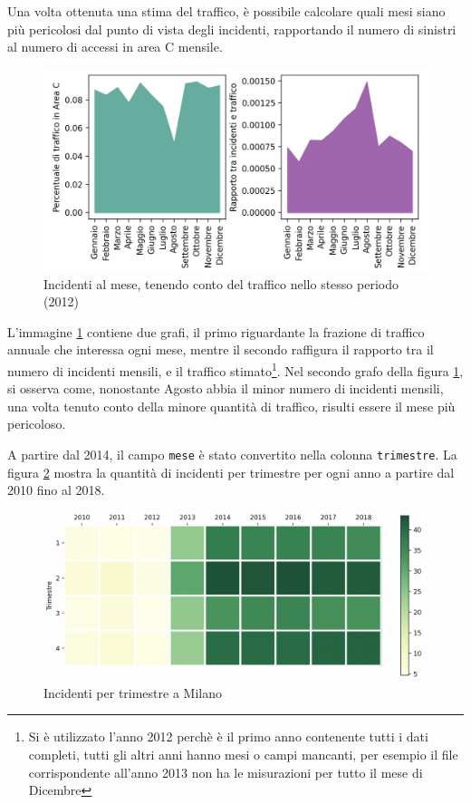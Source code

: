 \documentclass[a4paper,12pt]{report}
\newcommand{\columnstyle}[1]{\texttt{#1}}
\begin{document}
Una volta ottenuta una stima del traffico, è possibile calcolare quali mesi 
siano più pericolosi dal punto di vista degli incidenti, rapportando il numero di 
sinistri al numero di accessi in area C mensile.

\begin{figure}
    \includegraphics[width=\linewidth]{../src/area_c/rapporto_mese.png}
    \caption{Incidenti al mese, tenendo conto del traffico nello stesso periodo (2012)}
    \label{fig:incidenti-traffico-mese}
\end{figure}

L'immagine \ref{fig:incidenti-traffico-mese} contiene due grafi, 
il primo riguardante la frazione di traffico annuale che interessa ogni mese, 
mentre il secondo raffigura il rapporto tra il numero di incidenti mensili, e il traffico 
stimato\footnote{Si è utilizzato l'anno 2012 perchè è il primo anno contenente tutti i dati completi, 
tutti gli altri anni hanno mesi o campi mancanti, per esempio il file corrispondente all'anno 
2013 non ha le misurazioni per tutto il mese di Dicembre}.
Nel secondo grafo della figura \ref{fig:incidenti-traffico-mese}, si osserva come, 
nonostante Agosto abbia il minor numero di incidenti mensili, 
una volta tenuto conto della minore quantità di traffico, risulti essere 
il mese più pericoloso.

A partire dal 2014, il campo \columnstyle{mese} è stato convertito nella 
colonna \columnstyle{trimestre}.
La figura \ref{fig:milano-trimestri} mostra la quantità di incidenti per 
trimestre per ogni anno a partire dal 2010 fino al 2018.

\begin{figure}
    \includegraphics[width=\linewidth]{../src/incidenti/incidenti_senza_coords/mese_incidenti/trimestri.png}
    \caption{Incidenti per trimestre a Milano}
    \label{fig:milano-trimestri}
\end{figure}
\end{document}
